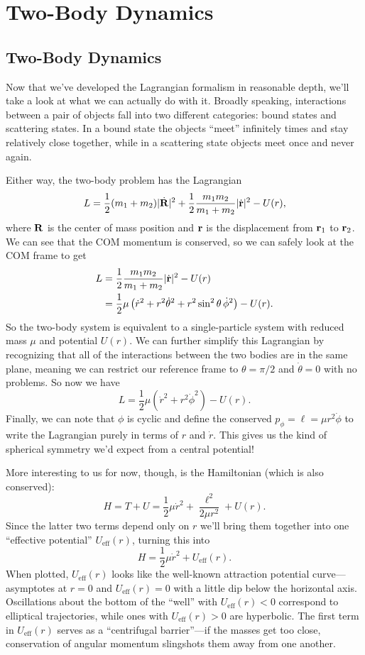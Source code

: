 \documentclass[../p111main.tex]{subfiles}
\begin{document}
\chapter{Two-Body Dynamics}
\section{Two-Body Dynamics}
Now that we've developed the Lagrangian formalism in reasonable depth, we'll take a look at what we can actually do with it.
Broadly speaking, interactions between a pair of objects fall into two different categories: bound states and scattering states.
In a bound state the objects ``meet'' infinitely times and stay relatively close together, while in a scattering state objects meet once and never again.

Either way, the two-body problem has the Lagrangian
\[ L = \frac{1}{2} (m_1 + m_2) |\dot{\mathbf{R}}|^2 + \frac{1}{2} \frac{m_1m_2}{m_1 + m_2} |\dot{\mathbf{r}}|^2 - U(r), \]
where $\mathbf{R}$ is the center of mass position and $\mathbf{r}$ is the displacement from $\mathbf{r}_1$ to $\mathbf{r}_2$.
We can see that the COM momentum is conserved, so we can safely look at the COM frame to get
\begin{align*}
    L &= \frac{1}{2} \frac{m_1 m_2}{m_1 + m_2} |\dot{\mathbf{r}}|^2 - U(r) \\
    &= \frac{1}{2} \mu \left( \dot r^2 + r^2 \dot \theta^2 + r^2 \sin^2 \theta \,\dot \phi^2 \right) - U(r).
\end{align*}
So the two-body system is equivalent to a single-particle system with reduced mass $\mu$ and potential $U(r)$.
We can further simplify this Lagrangian by recognizing that all of the interactions between the two bodies are in the same plane, meaning we can restrict our reference frame to $\theta = \pi / 2$ and $\dot \theta = 0$ with no problems.
So now we have
\[ L = \frac{1}{2} \mu \left( \dot r^2 + r^2 \dot \phi^2 \right) - U(r). \]
Finally, we can note that $\phi$ is cyclic and define the conserved $p_\phi = \ell = \mu r^2 \dot \phi$ to write the Lagrangian purely in terms of $r$ and $\dot r$.
This gives us the kind of spherical symmetry we'd expect from a central potential!

More interesting to us for now, though, is the Hamiltonian (which is also conserved):
\[ H = T + U = \frac{1}{2} \mu \dot r^2 + \frac{\ell^2}{2\mu r^2} + U(r). \]
Since the latter two terms depend only on $r$ we'll bring them together into one ``effective potential'' $U_\textrm{eff}(r)$, turning this into
\[ H = \frac{1}{2} \mu \dot r^2 + U_\textrm{eff}(r). \]
When plotted, $U_\textrm{eff}(r)$ looks like the well-known attraction potential curve---asymptotes at $r=0$ and $U_\text{eff}(r) = 0$ with a little dip below the horizontal axis.
Oscillations about the bottom of the ``well'' with $U_\textrm{eff}(r) < 0$ correspond to elliptical trajectories, while ones with $U_\textrm{eff}(r) > 0$ are hyperbolic.
The first term in $U_\textrm{eff}(r)$ serves as a ``centrifugal barrier''---if the masses get too close, conservation of angular momentum slingshots them away from one another.
\end{document}
